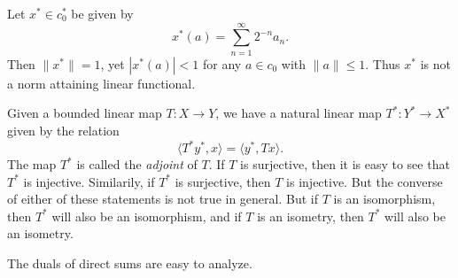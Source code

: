\begin{example}
    Let $x^* \in c_0^*$ be given by
    \[ x^*(a) = \sum_{n = 1}^\infty 2^{-n} a_n. \]
    Then $\| x^* \| = 1$, yet $|x^*(a)| < 1$ for any $a \in c_0$ with $\| a \| \leq 1$. Thus $x^*$ is not a norm attaining linear functional.
\end{example}

Given a bounded linear map $T: X \to Y$, we have a natural linear map $T^*: Y^* \to X^*$ given by the relation
%
\[ \langle T^* y^*, x \rangle = \langle y^*, Tx \rangle. \]
%
The map $T^*$ is called the \emph{adjoint} of $T$. If $T$ is surjective, then it is easy to see that $T^*$ is injective. Similarily, if $T^*$ is surjective, then $T$ is injective. But the converse of either of these statements is not true in general. But if $T$ is an isomorphism, then $T^*$ will also be an isomorphism, and if $T$ is an isometry, then $T^*$ will also be an isometry.

The duals of direct sums are easy to analyze.


